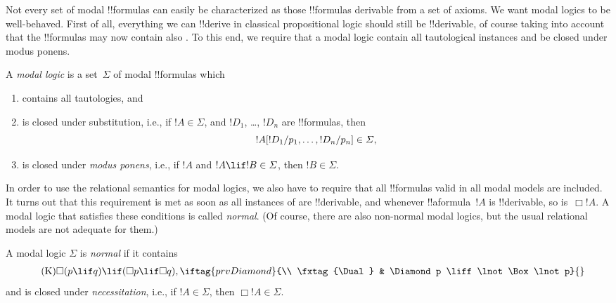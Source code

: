 \documentclass[../../../include/open-logic-section]{subfiles}
\begin{document}


Not every set of modal !!{formula}s can easily be characterized as
those !!{formula}s derivable from a set of axioms. We want modal
logics to be well-behaved. First of all, everything we can !!{derive}
in classical propositional logic should still be !!{derivable}, of
course taking into account that the !!{formula}s may now contain also
. To this end, we
require that a modal logic contain all tautological instances and be
closed under modus ponens.

\begin{defn}
  A \emph{modal logic} is a set~$\Sigma$ of modal !!{formula}s which
  \begin{enumerate}
  \item contains all tautologies, and
  \item is closed under substitution, i.e., if $!A \in \Sigma$, and
    $!D_1$, \dots, $!D_n$ are !!{formula}s, then
    \[
    !A[!D_1/p_1, \dots, !D_n/p_n] \in \Sigma,
    \]
    \item is closed under \emph{modus ponens}, i.e., if $!A$ and $!A
      \lif !B \in \Sigma$, then $!B \in \Sigma$.
  \end{enumerate}
\end{defn}

In order to use the relational semantics for modal logics, we also
have to require that all !!{formula}s valid in all modal models are
included. It turns out that this requirement is met as soon as all
instances of  are
!!{derivable}, and whenever !!a{formula}~$!A$ is !!{derivable}, so
is~$\Box !A$. A modal logic that satisfies these conditions is called
\emph{normal}. (Of course, there are also non-normal modal logics, but
the usual relational models are not adequate for them.)

\begin{defn}
  A modal logic $\Sigma$ is \emph{normal} if it contains
  \begin{align*}
    \tag{\Ax{K}} & \Box(p \lif q) \lif (\Box p \lif \Box q),
    \iftag{prvDiamond}{\\
      \tag{\Dual} & \Diamond p \liff \lnot\Box\lnot p}{}
  \end{align*}
  and is closed under \emph{necessitation}, i.e., if $!A \in
  \Sigma$, then $\Box !A \in \Sigma$.
\end{defn}
\end{document}
